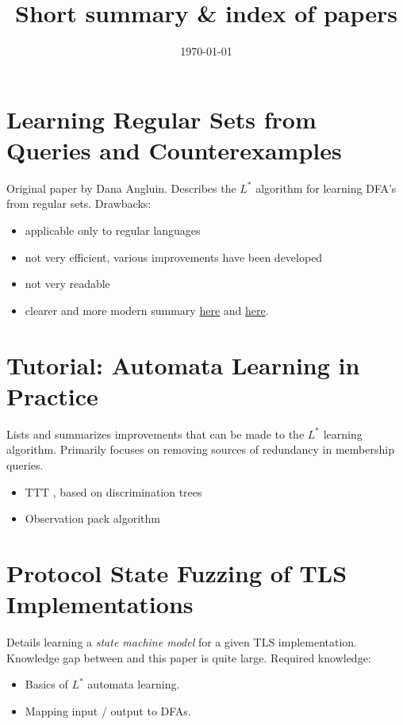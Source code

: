 \documentclass[11pt]{article}
\title{\textbf{Short summary \& index of papers}}
\author{}
\date{\today}
\begin{document}
\maketitle

\section{\cite{Angluin87} Learning Regular Sets from Queries and Counterexamples}
Original paper by Dana Angluin.
Describes the $L^*$ algorithm for learning DFA's from regular sets.
Drawbacks:
\begin{itemize}
  \item applicable only to regular languages
  \item not very efficient, various improvements have been developed
  \item not very readable
  \item clearer and more modern summary
        \href{https://www.cs.bgu.ac.il/~beimel/Courses/Learning/}{here} and
        \href{https://www.cs.bgu.ac.il/~beimel/Courses/Learning/lect3.ps}{here}.
\end{itemize}

\section{\cite{Howar14} Tutorial: Automata Learning in Practice}
Lists and summarizes improvements that can be made to the $L^*$ learning algorithm.
Primarily focuses on removing sources of redundancy in membership queries.
\begin{itemize}
  \item TTT \cite{Isberner14b}, based on discrimination trees\cite{Kearns94}
  \item Observation pack algorithm
\end{itemize}

\section{\cite{deRuiter15} Protocol State Fuzzing of TLS Implementations}
Details learning a \textit{state machine model} for a given TLS implementation.
Knowledge gap between \cite{Angluin87} and this paper is quite large.
Required knowledge:
\begin{itemize}
  \item \cite{Angluin87} Basics of $L^*$ automata learning.
  \item \cite{Steffen12} Mapping input / output to DFAs.
\end{itemize}
\end{document}
